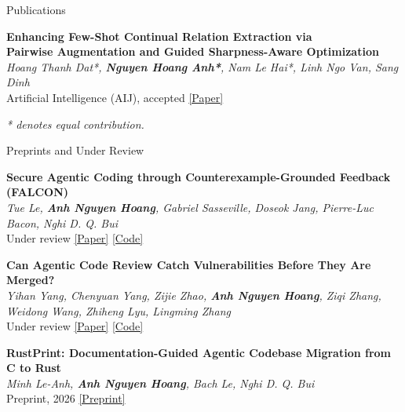 \documentclass{resume} %
\begin{document}
\begin{rSection}{Publications}
\begin{enumerate}[leftmargin=1.8em,label={[\arabic*]},itemsep=0.1em,topsep=0.1em]
    \item
    \textbf{Enhancing Few-Shot Continual Relation Extraction via\\
    Pairwise Augmentation and Guided Sharpness-Aware Optimization}\\
    \textit{Hoang Thanh Dat*, \textbf{Nguyen Hoang Anh*}, Nam Le Hai*,
    Linh Ngo Van, Sang Dinh}\\
    Artificial Intelligence (AIJ), accepted
    \href{https://www.sciencedirect.com/science/article/pii/S0004370226001712}{[Paper]}

\end{enumerate}
\textit{* denotes equal contribution.}

\end{rSection}


\begin{rSection}{Preprints and Under Review}

\begin{enumerate}[leftmargin=1.8em,label={[\arabic*]},itemsep=0.1em,topsep=0.1em]

    \item
    \textbf{Secure Agentic Coding through Counterexample-Grounded
    Feedback (FALCON)}\\
    \textit{Tue Le, \textbf{Anh Nguyen Hoang}, Gabriel Sasseville, Doseok Jang,
    Pierre-Luc Bacon, Nghi D. Q. Bui}\\
    Under review
    \href{https://arxiv.org/abs/2610.25916}{[Paper]}
    \href{https://github.com/FSoft-AI4Code/FALCON}{[Code]}

    \item
    \textbf{Can Agentic Code Review Catch Vulnerabilities Before They Are
    Merged?}\\
    \textit{Yihan Yang, Chenyuan Yang, Zijie Zhao, \textbf{Anh Nguyen Hoang},
    Ziqi Zhang, Weidong Wang, Zhiheng Lyu, Lingming Zhang}\\
    Under review
    \href{https://secprbench.github.io/paper.pdf}{[Paper]}
    \href{https://github.com/secprbench/secprbench}{[Code]}

    \item
    \textbf{RustPrint: Documentation-Guided Agentic Codebase Migration from C to Rust}\\
    \textit{Minh Le-Anh, \textbf{Anh Nguyen Hoang}, Bach Le, Nghi D. Q. Bui}\\
    Preprint, 2026
    \href{https://arxiv.org/abs/2605.14634}{[Preprint]}

\end{enumerate}

\end{rSection}
\end{document}
